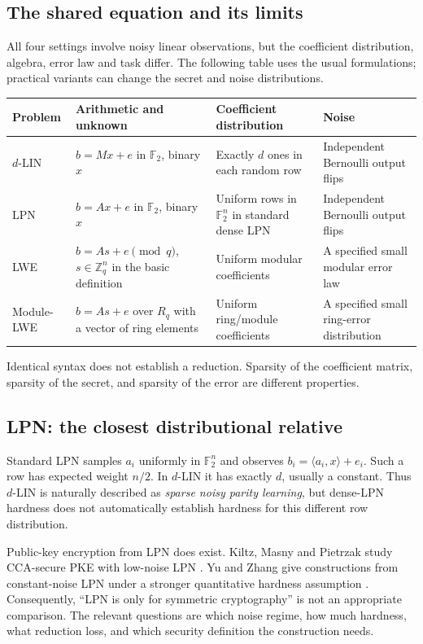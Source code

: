 \documentclass[11pt,a4paper]{article}
\newcommand{\F}{\mathbb F}
\newcommand{\Z}{\mathbb Z}
\begin{document}
\subsection{The shared equation and its limits}
All four settings involve noisy linear observations, but the coefficient distribution, algebra, error law and task differ. The following table uses the usual formulations; practical variants can change the secret and noise distributions.
\begin{center}\small
\begin{tabularx}{\textwidth}{@{}>{\raggedright\arraybackslash}p{1.4cm}YYY@{}}\toprule
Problem & Arithmetic and unknown & Coefficient distribution & Noise\\\midrule
$d$-LIN & $b=Mx+e$ in $\F_2$, binary $x$ & Exactly $d$ ones in each random row & Independent Bernoulli output flips\\[4pt]
LPN & $b=Ax+e$ in $\F_2$, binary $x$ & Uniform rows in $\F_2^n$ in standard dense LPN & Independent Bernoulli output flips\\[4pt]
LWE & $b=As+e\pmod q$, $s\in\Z_q^n$ in the basic definition & Uniform modular coefficients & A specified small modular error law\\[4pt]
Module-LWE & $b=As+e$ over $R_q$ with a vector of ring elements & Uniform ring/module coefficients & A specified small ring-error distribution\\\bottomrule
\end{tabularx}\end{center}
Identical syntax does not establish a reduction. Sparsity of the coefficient matrix, sparsity of the secret, and sparsity of the error are different properties.

\subsection{LPN: the closest distributional relative}
Standard LPN samples $a_i$ uniformly in $\F_2^n$ and observes $b_i=\langle a_i,x\rangle+e_i$. Such a row has expected weight $n/2$. In $d$-LIN it has exactly $d$, usually a constant. Thus $d$-LIN is naturally described as \emph{sparse noisy parity learning}, but dense-LPN hardness does not automatically establish hardness for this different row distribution.

Public-key encryption from LPN does exist. Kiltz, Masny and Pietrzak study CCA-secure PKE with low-noise LPN \cite{kmp}. Yu and Zhang give constructions from constant-noise LPN under a stronger quantitative hardness assumption \cite{yz}. Consequently, ``LPN is only for symmetric cryptography'' is not an appropriate comparison. The relevant questions are which noise regime, how much hardness, what reduction loss, and which security definition the construction needs.
\end{document}
